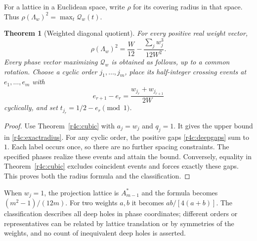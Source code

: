 \documentclass[11pt,a4paper]{article}
\newtheorem{theorem}{Theorem}[section]
\theoremstyle{definition}\newtheorem{definition}[theorem]{Definition}
\theoremstyle{remark}\newtheorem{remark}[theorem]{Remark}
\numberwithin{equation}{section}
\begin{document}
For a lattice in a Euclidean space, write $\rho$ for its covering
radius in that space.  Thus
$\rho(\Lambda_w)^2=\max_t\mathcal Q_w(t)$.

\begin{theorem}[Weighted diagonal quotient]\label{r4c:radius}
For every positive real weight vector,
\begin{equation}\label{r4c:exactradius}
 \boxed{\displaystyle
 \rho(\Lambda_w)^2
   =\frac W{12}-\frac{\sum_jw_j^3}{12W^2}.}
\end{equation}
Every phase vector maximizing $\mathcal Q_w$ is obtained as follows,
up to a common rotation.  Choose a cyclic order $j_1,\ldots,j_m$,
place its half-integer crossing events at $e_1,\ldots,e_m$ with
\begin{equation}\label{r4c:deepgaps}
 e_{r+1}-e_r=\frac{w_{j_r}+w_{j_{r+1}}}{2W}
\end{equation}
cyclically, and set $t_{j_r}=1/2-e_r\pmod1$.
\end{theorem}

\begin{proof}
Use Theorem~\ref{r4c:cubic} with $a_j=w_j$ and $q_j=1$.
It gives the upper bound in \eqref{r4c:exactradius}.
For any cyclic order, the positive gaps \eqref{r4c:deepgaps} sum to
$1$.  Each label occurs once, so there are no further spacing
constraints.  The specified phases realize these events and attain
the bound.  Conversely, equality in Theorem~\ref{r4c:cubic} excludes
coincident events and forces exactly these gaps.  This proves both
the radius formula and the classification.
\end{proof}

When $w_j=1$, the projection lattice is $A_{m-1}^{*}$ and the formula
becomes $(m^2-1)/(12m)$.  For two weights $a,b$ it becomes
$ab/[4(a+b)]$.  The classification describes all deep holes in phase
coordinates; different orders or representatives can be related by
lattice translation or by symmetries of the weights, and no count of
inequivalent deep holes is asserted.
\end{document}
